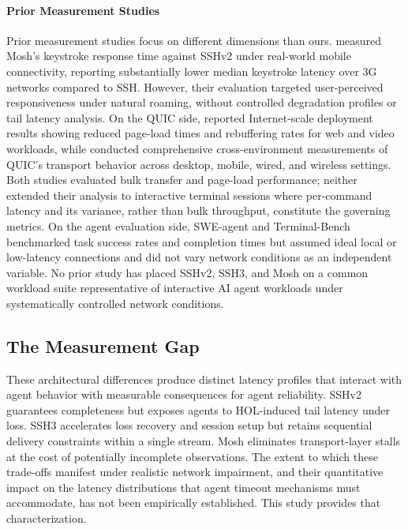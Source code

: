 \paragraph{Prior Measurement Studies}
Prior measurement studies focus on different dimensions than ours. \cite{Winstein2012} measured Mosh's keystroke response time against SSHv2 under real-world mobile connectivity, reporting substantially lower median keystroke latency over 3G networks compared to SSH. However, their evaluation targeted user-perceived responsiveness under natural roaming, without controlled degradation profiles or tail latency analysis. On the QUIC side, \cite{Langley2017} reported Internet-scale deployment results showing reduced page-load times and rebuffering rates for web and video workloads, while \cite{Kakhki2017} conducted comprehensive cross-environment measurements of QUIC's transport behavior across desktop, mobile, wired, and wireless settings. Both studies evaluated bulk transfer and page-load performance; neither extended their analysis to interactive terminal sessions where per-command latency and its variance, rather than bulk throughput, constitute the governing metrics. On the agent evaluation side, SWE-agent \cite{Yang2024} and Terminal-Bench \cite{merrill2026} benchmarked task success rates and completion times but assumed ideal local or low-latency connections and did not vary network conditions as an independent variable. No prior study has placed SSHv2, SSH3, and Mosh on a common workload suite representative of interactive AI agent workloads under systematically controlled network conditions.


\subsection{The Measurement Gap}
\label{subsec:gap}

These architectural differences produce distinct latency profiles that interact with agent behavior with measurable consequences for agent reliability. SSHv2 guarantees completeness but exposes agents to HOL-induced tail latency under loss. SSH3 accelerates loss recovery and session setup but retains sequential delivery constraints within a single stream. Mosh eliminates transport-layer stalls at the cost of potentially incomplete observations. The extent to which these trade-offs manifest under realistic network impairment, and their quantitative impact on the latency distributions that agent timeout mechanisms must accommodate, has not been empirically established. This study provides that characterization.

